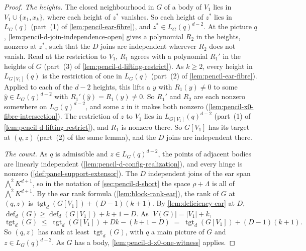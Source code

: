 \begin{proof}
  \emph{The heights.} The closed neighbourhood in $G$ of a body of $V_1$
  lies in $V_1 \cup \{x_1, x_k\}$, where each height of $z^*$ vanishes.
  So each height of $z^*$ lies in $L_G(q)$ (part~(1) of
  \cref{lem:pencil-ear-fibre}), and $z^* \in L_G(q)^{d-2}$. At the
  picture $q$, \cref{lem:pencil-d-join-independence-open} gives a
  polynomial $R_2$ in the heights, nonzero at $z^*$, such that the $D$
  joins are independent wherever $R_2$ does not vanish. Read at the
  restriction to $V_1$, $R_1$ agrees with a polynomial $R_1'$ in the
  heights of $G$ (part~(3) of \cref{lem:pencil-d-lifting-restrict}). As
  $k \ge 2$, every height in $L_{G[V_1]}(q)$ is the restriction of one
  in $L_G(q)$ (part~(2) of \cref{lem:pencil-ear-fibre}). Applied to each
  of the $d - 2$ heights, this lifts a $y$ with $R_1(y) \neq 0$ to some
  $\hat y \in L_G(q)^{d-2}$ with $R_1'(\hat y) = R_1(y) \neq 0$. So
  $R_1'$ and $R_2$ are each nonzero somewhere on $L_G(q)^{d-2}$, and
  some $z$ in it makes both nonzero
  (\cref{lem:pencil-x0-fibre-intersection}). The restriction of $z$ to
  $V_1$ lies in $L_{G[V_1]}(q)^{d-2}$ (part~(1) of
  \cref{lem:pencil-d-lifting-restrict}), and $R_1$ is nonzero there. So
  $G[V_1]$ has its target at $(q, z)$ (part~(2) of the same lemma), and
  the $D$ joins are independent there.

  \emph{The count.} As $q$ is admissible and $z \in L_G(q)^{d-2}$, the
  points of adjacent bodies are linearly independent
  (\cref{lem:pencil-d-config-realization}), and every hinge is nonzero
  (\cref{def:panel-support-extensor}). The $D$ independent joins of the
  ear span $\bigwedge^2 K^{d+1}$, so in the notation of
  \cref{sec:pencil-d-short} the space $\rho + \Lambda$ is all of
  $\bigwedge^2 K^{d+1}$. By the ear rank formula
  (\cref{lem:block-rank-ear}), the rank of $G$ at $(q, z)$ is
  $\operatorname{tgt}_d(G[V_1]) + (D - 1)(k + 1)$. By
  \cref{lem:deficiency-ear} at $D$,
  $\operatorname{def}_d(G) \ge \operatorname{def}_d(G[V_1]) + k + 1 - D$.
  As $|V(G)| = |V_1| + k$,
  \[
    \operatorname{tgt}_d(G) \;\le\; \operatorname{tgt}_d(G[V_1]) + Dk
    - (k + 1 - D) \;=\; \operatorname{tgt}_d(G[V_1]) + (D - 1)(k + 1).
  \]
  So $(q, z)$ has rank at least $\operatorname{tgt}_d(G)$, with $q$ a
  main picture of $G$ and $z \in L_G(q)^{d-2}$. As $G$ has a body,
  \cref{lem:pencil-d-x0-one-witness} applies.


\end{proof}
